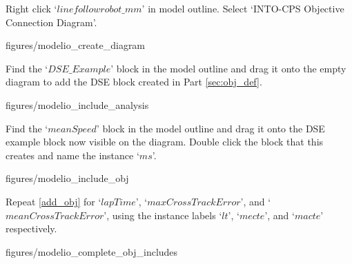 \documentclass[11pt,a4paper]{../tutorial}
\begin{document}
\begin{instructions}

\item Right click `$linefollowrobot\_mm$' in model outline. Select `INTO-CPS \menusep Objective Connection Diagram'.

\begin{center}
\begin{annotation}[width=0.7\linewidth]{figures/modelio_create_diagram}
    \end{annotation}
\end{center}

\item Find the `$DSE\_Example$' block in the model outline and drag it onto the empty diagram to add the DSE block created in Part \ref{sec:obj_def}.

\begin{center}
\begin{annotation}[width=0.7\linewidth]{figures/modelio_include_analysis}
    \end{annotation}
\end{center}

\newpage

\item \label{add_obj} Find the `$meanSpeed$' block in the model outline and drag it onto the DSE example block now visible on the diagram. Double click the block that this creates and name the instance `$ms$'.

\begin{center}
\begin{annotation}[width=0.7\linewidth]{figures/modelio_include_obj}
    \end{annotation}
\end{center}

\item Repeat \ref{add_obj} for `$lapTime$', `$maxCrossTrackError$', and `$meanCrossTrackError$', using the instance labels `$lt$', `$mecte$', and `$macte$' respectively.

\begin{center}
\begin{annotation}[width=0.7\linewidth]{figures/modelio_complete_obj_includes}
    \end{annotation}
\end{center}


\end{instructions}
\end{document}
